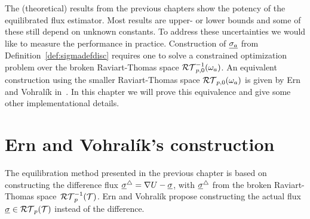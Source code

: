 \documentclass[thesis.tex]{subfiles}
\begin{document}
The (theoretical) results from the previous chapters show the potency of the equilibrated flux estimator. 
Most results are upper- or lower bounds and some of these still depend on unknown constants.
To address these uncertainties we would like to measure the performance in practice.
Construction of $\underline{\sigma_a}$ from Definition~\ref{def:sigmadefdisc} requires one to solve a constrained
optimization problem over the broken Raviart-Thomas space $\mathcal{RT}_{p,0}^{-1}(\omega_a)$.
An equivalent construction using the smaller Raviart-Thomas space $\mathcal{RT}_{p,0}(\omega_a)$ is given by Ern and Vohral\'ik in~\cite{ernequil}. In this
chapter we will prove this equivalence and give some other implementational details.

\section{Ern and Vohral\'ik's construction}
The equilibration method presented in the previous chapter is based on constructing the difference flux $\underline{\sigma}^\triangle 
= \nabla U - \underline{\sigma}$, 
with $\underline{\sigma}^\triangle$ from the broken Raviart-Thomas space~$\mathcal{RT}_p^{-1}(\mathcal{T})$. 
Ern and Vohral\'ik \cite{ernequil} propose constructing the actual flux $\underline{\sigma} \in \mathcal{RT}_p(\mathcal{T})$ instead of the difference.
\end{document}

